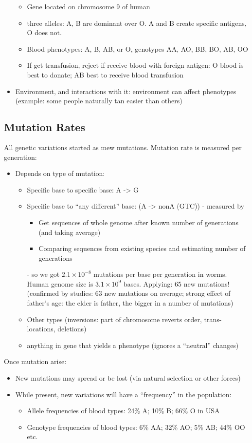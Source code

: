 \documentclass{scrartcl}
\begin{document}
\begin{itemize}
\begin{itemize}
\item Gene located on chromosome 9 of human
\item three alleles: A, B are dominant over O. A and B create specific antigens, O does not.
\item Blood phenotypes: A, B, AB, or O, genotypes AA, AO, BB, BO, AB, OO
\item If get transfusion, reject if receive blood with foreign antigen: O blood is best to donate; AB best to receive blood transfusion
\end{itemize}
\item Environment, and interactions with it: environment can affect phenotypes (example: some people naturally tan easier than others)
\end{itemize}
\subsection{Mutation Rates}
\label{sec:4-3}
All genetic variations started as mew mutations. Mutation rate is measured per generation:
\begin{itemize}
\item Depends on type of mutation:
  \begin{itemize}
  \item Specific base to specific base: A -> G
  \item Specific base to ``any different'' base: (A -> nonA (GTC)) - measured by
    \begin{itemize}
    \item Get sequences of whole genome after known number of generations (and taking average)
    \item Comparing sequences from existing species and estimating number of generations
    \end{itemize}
- so we got $2.1 \times 10^{-8}$ mutations per base per generation in worms. Human genome size is $3.1 \times 10^9$ bases. 
Applying: 65 new mutations! (confirmed by studies: 63 new mutations on average; strong effect of father's age: the elder is father, the bigger in a number of mutations)
  \item Other types (inversions: part of chromosome reverts order, trans-locations, deletions)
  \item anything in gene that yields a phenotype (ignores a ``neutral'' changes)
  \end{itemize}
\end{itemize}
Once mutation arise:
\begin{itemize}
\item New mutations may spread or be lost (via natural selection or other forces)
\item While present, new variations will have a ``frequency'' in the population:
  \begin{itemize}
  \item Allele frequencies of blood types: 24\% A; 10\% B; 66\% O in USA
  \item Genotype frequencies of blood types: 6\% AA; 32\% AO; 5\% AB; 44\% OO etc.
  \end{itemize}
\end{itemize}
\end{document}

